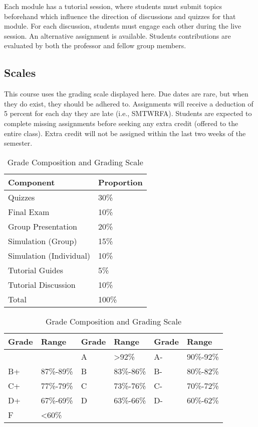 \documentclass[10pt,]{article}
\begin{document}
Each module has a tutorial session, where students must submit topics
beforehand which influence the direction of discussions and quizzes for
that module. For each discussion, students must engage each other during
the live session. An alternative assignment is available. Students
contributions are evaluated by both the professor and fellow group
members.

\hypertarget{scales}{%
\subsection{Scales}\label{scales}}

This course uses the grading scale displayed here. Due dates are rare,
but when they do exist, they should be adhered to. Assignments will
receive a deduction of 5 percent for each day they are late (i.e.,
SMTWRFA). Students are expected to complete missing assignments before
seeking any extra credit (offered to the entire class). Extra credit
will not be assigned within the last two weeks of the semester.

\begin{table}[!h]
\caption{\label{tab:unnamed-chunk-3}Grade Composition and Grading Scale}

\centering
\begin{tabular}[t]{ll}
\toprule
Component & Proportion\\
\midrule
Quizzes & 30\%\\
Final Exam & 10\%\\
Group Presentation & 20\%\\
Simulation (Group) & 15\%\\
Simulation (Individual) & 10\%\\
\addlinespace
Tutorial Guides & 5\%\\
Tutorial Discussion & 10\%\\
Total & 100\%\\
\bottomrule
\end{tabular}
\centering
\begin{tabular}[t]{llllll}
\toprule
Grade & Range & Grade & Range & Grade & Range\\
\midrule
 &  & A & >92\% & A- & 90\%-92\%\\
B+ & 87\%-89\% & B & 83\%-86\% & B- & 80\%-82\%\\
C+ & 77\%-79\% & C & 73\%-76\% & C- & 70\%-72\%\\
D+ & 67\%-69\% & D & 63\%-66\% & D- & 60\%-62\%\\
F & <60\% &  &  &  & \\
\bottomrule
\end{tabular}
\end{table}
\end{document}
